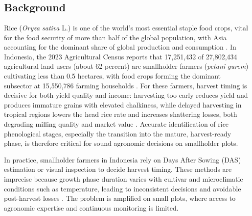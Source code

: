 \chapter{\babSatu}
 


\section{Background}

Rice (\textit{Oryza sativa} L.) is one of the world's most essential staple food crops, vital for the food security of more than half of the global population, with Asia accounting for the dominant share of global production and consumption \cite{mohidem2022rice}. In Indonesia, the 2023 Agricultural Census reports that 17{,}251{,}432 of 27{,}802{,}434 agricultural land users (about 62 percent) are smallholder farmers (\textit{petani gurem}) cultivating less than 0.5 hectares, with food crops forming the dominant subsector at 15{,}550{,}786 farming households \cite{bps2023sensus}. For these farmers, harvest timing is decisive for both yield quality and income: harvesting too early reduces yield and produces immature grains with elevated chalkiness, while delayed harvesting in tropical regions lowers the head rice rate and increases shattering losses, both degrading milling quality and market value \cite{zhou2025metaharvest}. Accurate identification of rice phenological stages, especially the transition into the mature, harvest-ready phase, is therefore critical for sound agronomic decisions on smallholder plots.

In practice, smallholder farmers in Indonesia rely on Days After Sowing (DAS) estimation or visual inspection to decide harvest timing. These methods are imprecise because growth phase duration varies with cultivar and microclimatic conditions such as temperature, leading to inconsistent decisions and avoidable post-harvest losses \cite{sanwong2023ricetemp}. The problem is amplified on small plots, where access to agronomic expertise and continuous monitoring is limited.


